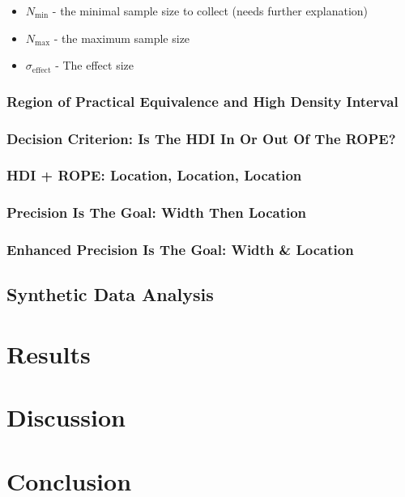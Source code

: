 \documentclass{article}
\begin{document}
  \begin{itemize}
        \item $N_\mathrm{min}$ - the minimal sample size to collect (needs further explanation)
        \item $N_\mathrm{max}$ - the maximum sample size
        \item $\sigma_\mathrm{effect}$ - The effect size
         
  \end{itemize}

\subsubsection{Region of Practical Equivalence and High Density Interval}

\subsubsection{Decision Criterion: Is The HDI In Or Out Of The ROPE?}

\subsubsection{HDI + ROPE: Location, Location, Location}

\subsubsection{Precision Is The Goal: Width Then Location}

\subsubsection{Enhanced Precision Is The Goal: Width \& Location}

\subsection{Synthetic Data Analysis}


\section{Results}

\section{Discussion}

\section{Conclusion}
\end{document}
